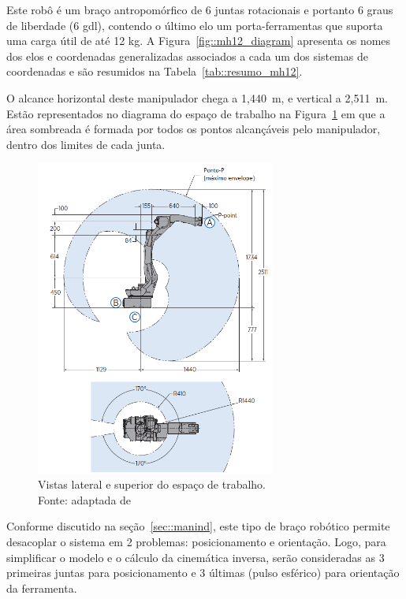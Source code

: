 Este robô é um braço antropomórfico de 6 juntas rotacionais e portanto 6 graus
de liberdade (6 gdl), contendo o último elo um porta-ferramentas que suporta uma
carga útil de até 12 kg. A Figura~\ref{fig::mh12_diagram} apresenta os nomes dos
elos e coordenadas generalizadas associados a cada um dos sistemas de
coordenadas e são resumidos na Tabela~\ref{tab::resumo_mh12}.

O alcance horizontal deste manipulador chega a 1,440~m, e vertical a
2,511~m. Estão representados no diagrama do espaço de trabalho na
Figura~\ref{fig::workspace} em que a área sombreada é formada por todos os
pontos alcançáveis pelo manipulador, dentro dos limites de cada junta.

\begin{figure}[h]
	\centering 
 	\includegraphics[width=0.7\textwidth]{figs/workspace}
 	\caption[Vistas lateral e superior do espaço de trabalho]{Vistas lateral e
 	superior do espaço de trabalho. \\Fonte: adaptada de}
 	\label{fig::workspace}
\end{figure}

Conforme discutido na seção~\ref{sec::manind}, este tipo de braço robótico
permite desacoplar o sistema em 2 problemas: posicionamento e orientação. Logo,
para simplificar o modelo e o cálculo da cinemática inversa, serão consideradas
as 3 primeiras juntas para posicionamento e 3 últimas (pulso esférico) para
orientação da ferramenta.

